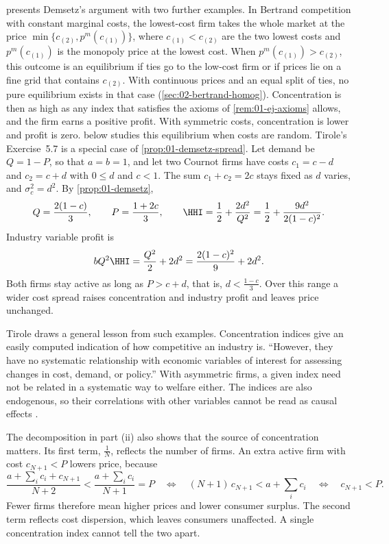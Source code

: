 \citet[Section~5.5]{Tirole1988} presents Demsetz's argument with two further examples. In Bertrand competition
with constant marginal costs, the lowest-cost firm takes the whole market at the price $\min\{c_{(2)}, p^m(c_{(1)})\}$,
where $c_{(1)} < c_{(2)}$ are the two lowest costs and $p^m(c_{(1)})$ is the monopoly price at the lowest cost. When
$p^m(c_{(1)}) > c_{(2)}$, this outcome is an equilibrium if ties go to the low-cost firm or if prices lie on a fine grid
that contains $c_{(2)}$. With continuous prices and an equal split of ties, no pure equilibrium exists in that case
(\cref{sec:02-bertrand-homog}).
Concentration is then as high as any index that satisfies the axioms of \cref{rem:01-ej-axioms} allows, and the
firm earns a positive profit. With symmetric costs, concentration is lower and profit is zero.
 below studies this equilibrium when costs are random. Tirole's Exercise~5.7 is a
special case of \cref{prop:01-demsetz-spread}. Let demand be $Q = 1 - P$, so that $a = b = 1$, and let two
Cournot firms have costs $c_1 = c - d$ and $c_2 = c + d$ with $0 \le d$ and $c < 1$. The sum $c_1 + c_2 = 2c$
stays fixed as $d$ varies, and $\sigma_c^2 = d^2$. By \cref{prop:01-demsetz},
\[
  Q = \frac{2(1 - c)}{3}, \qquad P = \frac{1 + 2c}{3}, \qquad
  \HHI = \frac{1}{2} + \frac{2d^2}{Q^2} = \frac{1}{2} + \frac{9 d^2}{2(1 - c)^2} .
\]
Industry variable profit is
\[
  bQ^2 \HHI = \frac{Q^2}{2} + 2d^2 = \frac{2(1 - c)^2}{9} + 2d^2 .
\]
Both firms stay active as long as $P > c + d$, that is, $d < \frac{1 - c}{3}$. Over this range a wider cost
spread raises concentration and industry profit and leaves price unchanged.

Tirole draws a general lesson from such examples. Concentration indices give an easily computed indication of how
competitive an industry is. ``However, they have no systematic relationship with economic variables of interest
for assessing changes in cost, demand, or policy.'' With asymmetric firms, a given index need not be related in a
systematic way to welfare either. The indices are also endogenous, so their correlations with other variables
cannot be read as causal effects \citep[Section~5.5]{Tirole1988}.

The decomposition in part (ii) also shows that the source of concentration matters. Its first term,
$\frac{1}{N}$, reflects the number of firms. An extra active firm with cost $c_{N+1} < P$ lowers price,
because
\[
\frac{a + \sum_i c_i + c_{N+1}}{N + 2} < \frac{a + \sum_i c_i}{N + 1} = P
\quad\Longleftrightarrow\quad (N + 1) \, c_{N+1} < a + \sum_i c_i
\quad\Longleftrightarrow\quad c_{N+1} < P .
\]
Fewer firms therefore mean higher prices and lower consumer surplus. The second term reflects cost
dispersion, which leaves consumers unaffected. A single concentration index cannot tell the two apart.

